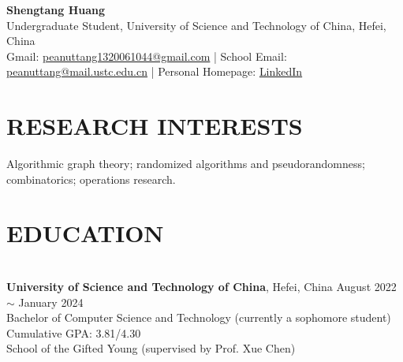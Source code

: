 \documentclass[a4paper,9pt]{extarticle}
\begin{document}
\pagestyle{fancy}
\renewcommand{\headrulewidth}{0pt}
\fancyhead{}
\fancyhead[R]{\textit{\today}}
\thispagestyle{empty} %

\begin{flushleft}
\textbf{\LARGE Shengtang Huang}\\[2pt] %
Undergraduate Student, University of Science and Technology of China, Hefei, China
\\ Gmail: \href{mailto:peanuttang1320061044@gmail.com}{peanuttang1320061044@gmail.com} | School Email: \href{mailto:peanuttang@mail.ustc.edu.cn}{peanuttang@mail.ustc.edu.cn} | Personal Homepage: \href{https://shengtanghuang.netlify.app/about/}{LinkedIn} %
\end{flushleft}

\section*{RESEARCH INTERESTS}
\noindent
Algorithmic graph theory; randomized algorithms and pseudorandomness; combinatorics; operations research.
\section*{EDUCATION}

\noindent\\
\textbf{University of Science and Technology of China},  Hefei, China \hfill August 2022 $\sim$ January 2024\\ %
Bachelor of Computer Science and Technology (currently a sophomore student) \hfill Cumulative GPA: 3.81/4.30 \\
School of the Gifted Young (supervised by Prof. Xue Chen)

\end{document}
